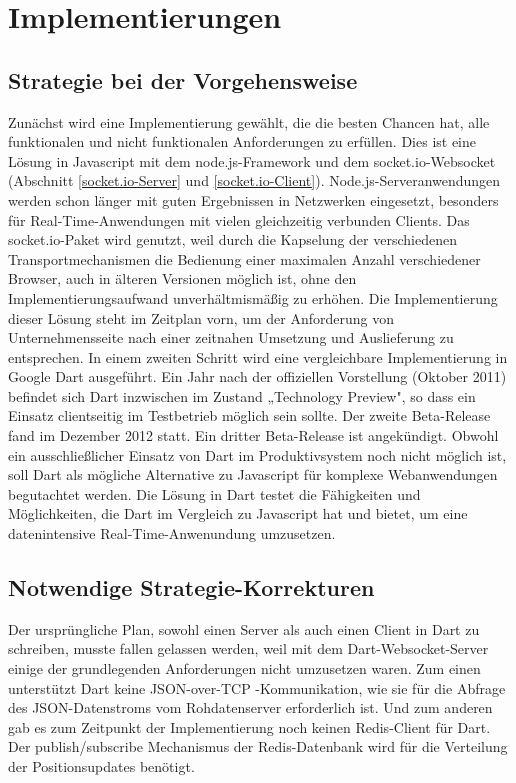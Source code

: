 
\chapter{Implementierungen}\label{s.Implementierungen}

\section{Strategie bei der Vorgehensweise}\label{Strategie bei der Vorgehensweise}
Zunächst wird eine Implementierung gewählt, die die besten Chancen hat, alle funktionalen und nicht funktionalen Anforderungen zu erfüllen. Dies ist eine Lösung in Javascript mit dem node.js-Framework und dem socket.io-Websocket (Abschnitt \ref{socket.io-Server} und \ref{socket.io-Client}). Node.js-Serveranwendungen werden schon länger mit guten Ergebnissen in Netzwerken eingesetzt, besonders für Real-Time-Anwendungen mit vielen gleichzeitig verbunden Clients. Das socket.io-Paket wird genutzt, weil durch die Kapselung der verschiedenen Transportmechanismen die Bedienung einer maximalen Anzahl verschiedener Browser, auch in älteren Versionen möglich ist, ohne den Implementierungsaufwand unverhältmismäßig zu erhöhen. Die Implementierung dieser Lösung steht im Zeitplan vorn, um der Anforderung von Unternehmensseite nach einer zeitnahen Umsetzung und Auslieferung zu entsprechen.
In einem zweiten Schritt wird eine vergleichbare Implementierung in Google Dart ausgeführt. Ein Jahr nach der offiziellen Vorstellung (Oktober 2011) befindet sich Dart inzwischen im Zustand
„Technology Preview", so dass ein Einsatz clientseitig im Testbetrieb möglich sein sollte. Der zweite Beta-Release fand im Dezember 2012 statt. Ein dritter Beta-Release ist angekündigt. Obwohl ein ausschließlicher Einsatz von Dart im Produktivsystem noch nicht möglich ist, soll Dart als mögliche Alternative zu Javascript für komplexe Webanwendungen begutachtet werden. Die Lösung in Dart testet die Fähigkeiten und Möglichkeiten, die Dart im Vergleich zu Javascript hat und bietet, um eine datenintensive Real-Time-Anwenundung umzusetzen.
\section{Notwendige Strategie-Korrekturen}\label{Strategie-Korrektur}
Der ursprüngliche Plan, sowohl einen Server als auch einen Client in Dart zu schreiben, musste fallen gelassen werden, weil mit dem Dart-Websocket-Server einige der grundlegenden Anforderungen nicht umzusetzen waren. Zum einen unterstützt Dart keine JSON-over-TCP -Kommunikation, wie sie für die Abfrage des JSON-Datenstroms vom Rohdatenserver erforderlich ist. Und zum anderen gab es zum Zeitpunkt der Implementierung noch keinen Redis-Client für Dart. Der publish/subscribe Mechanismus der Redis-Datenbank wird für die Verteilung der Positionsupdates benötigt.\\

